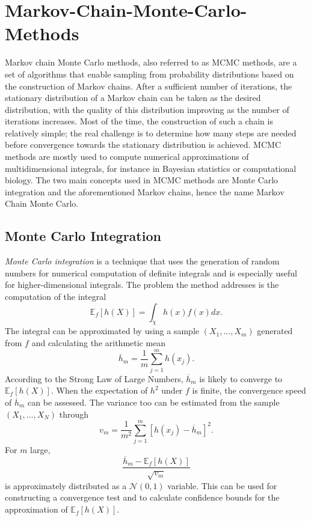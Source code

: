 \section{Markov-Chain-Monte-Carlo-Methods}
Markov chain Monte Carlo methods, also referred to as MCMC methods, are a set of algorithms that enable sampling from probability distributions based on the construction of Markov chains. After a sufficient number of iterations, the stationary distribution of a Markov chain can be taken as the desired distribution, with the quality of this distribution improving as the number of iterations increases. Most of the time, the construction of such a chain is relatively simple; the real challenge is to determine how many steps are needed before convergence towards the stationary distribution is achieved. MCMC methods are mostly used to compute numerical approximations of multidimensional integrals, for instance in Bayesian statistics or computational biology. The two main concepts used in MCMC methods are Monte Carlo integration and the aforementioned Markov chains, hence the name Markov Chain Monte Carlo.
\subsection{Monte Carlo Integration}
\textit{Monte Carlo integration} is a technique that uses the generation of random numbers for numerical computation of definite integrals and is especially useful for higher-dimensional integrals. The problem the method addresses is the computation of the integral
\begin{equation}
    \mathbb{E}_f\left[h\left(X\right)\right]=\int_\chi h(x)f(x)dx.
\end{equation}
The integral can be approximated by using a sample $\left(X_1,...,X_m\right)$ generated from $f$ and calculating the arithmetic mean
\begin{equation}
    \overline{h}_m=\frac{1}{m}\sum_{j=1}^mh\left(x_j\right).
\end{equation}
According to the Strong Law of Large Numbers, $\overline{h}_m$ is likely to converge to $\mathbb{E}_f\left[h\left(X\right)\right]$. When the expectation of $h^2$ under $f$ is finite, the convergence speed of $\overline{h}_m$ can be assessed. The variance too can be estimated from the sample $\left(X_1,...,X_N\right)$ through
\begin{equation}
    v_m=\frac{1}{m^2}\sum_{j=1}^m\left[h\left(x_j\right)-\overline{h}_m\right]^2.
\end{equation}
For $m$ large,
\begin{equation}
    \frac{\overline{h}_m-\mathbb{E}_f\left[h\left(X\right)\right]}{\sqrt{v_m}}
\end{equation}
is approximately distributed as a $\mathcal{N}(0,1)$ variable. This can be used for constructing a convergence test and to calculate confidence bounds for the approximation of $\mathbb{E}_f\left[h\left(X\right)\right]$\autocite[Cf.][]{robert2013monte}.

